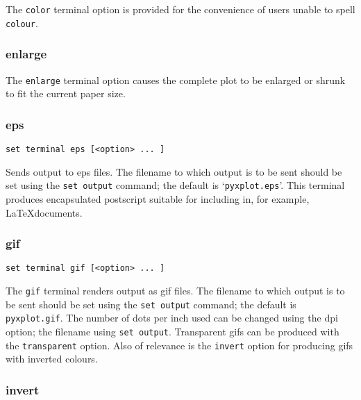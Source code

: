 \documentclass[a4paper,onecolumn,11pt]{book}
\begin{document}
The {\tt color} terminal option is provided for the convenience of users unable
to spell {\tt colour}.

\subsubsection{enlarge}

The {\tt enlarge} terminal option causes the complete plot to be enlarged or
shrunk to fit the current paper size.

\subsubsection{eps}

\begin{verbatim}
set terminal eps [<option> ... ]
\end{verbatim}

Sends output to eps files.  The filename to which output is to be sent should be
set using the {\tt set output} command; the default is `\texttt{pyxplot.eps}'.  This
terminal produces encapsulated postscript suitable for including in, for
example, \LaTeX documents.


\subsubsection{gif}

\begin{verbatim}
set terminal gif [<option> ... ]
\end{verbatim}

The {\tt gif} terminal renders output as gif files. The filename to which output
is to be sent should be set using the {\tt set output} command; the default is
{\tt pyxplot.gif}. The number of dots per inch used can be changed using the dpi
option; the filename using {\tt set output}. Transparent gifs can be produced
with the {\tt transparent} option. Also of relevance is the {\tt invert} option
for producing gifs with inverted colours.


\subsubsection{invert}
\end{document}
